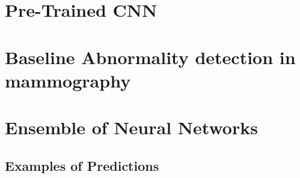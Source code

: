 \documentclass{book}
\begin{document}
    
    \chapter{Pre-Trained CNN}


    \chapter{Baseline Abnormality detection in mammography}


    \chapter{Ensemble of Neural Networks}
    \section{Examples of Predictions}

\end{document}
